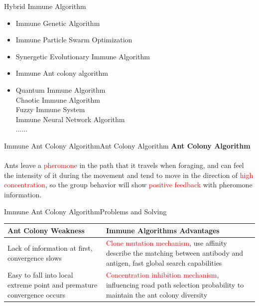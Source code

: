 \begin{frame}{Hybrid Immune Algorithm}
\begin{itemize}
\item{Immune Genetic Algorithm}
\item{Immune Particle Swarm Optimization}
\item{Synergetic Evolutionary Immune Algorithm}
\item{Immune Ant colony algorithm}
\item{
Quantum Immune Algorithm\\
Chaotic Immune Algorithm\\
Fuzzy Immune System\\
Immune Neural Network Algorithm\\
......
}
\end{itemize}
\small
{\noindent

}
\end{frame}

\begin{frame}{Immune Ant Colony Algorithm}{Ant Colony Algorithm}
 \large \textbf{Ant Colony Algorithm}\\~\\
 \small
 {
Ants leave a \textcolor{red}{pheromone} in the path that it travels when foraging, and can feel the intensity of it during the movement and tend to move in the direction of \textcolor{red}{high concentration}, so the  group behavior will show \textcolor{red}{positive feedback} with pheromone information.
 }\\
\end{frame}

\begin{frame}{Immune Ant Colony Algorithm}{Problems and Solving}
\begin{table}
\begin{tabular}{p{11em}|p{19em}}
\toprule
\textbf{Ant Colony Weakness} & \textbf{Immune Algorithms Advantages}\\
\midrule \small
\footnotesize{Lack of information at first, convergence slows} & \footnotesize{ \textcolor{red}{Clone mutation mechanism}, use affinity describe the matching between antibody and antigen, fast global search capabilities}\\
\footnotesize{Easy to fall into local extreme point and premature convergence occurs} & \footnotesize{ \textcolor{red}{Concentration inhibition mechanism}, influencing road path selection probability to maintain the ant colony diversity} \\
\bottomrule
\end{tabular}
\end{table}
\end{frame}

